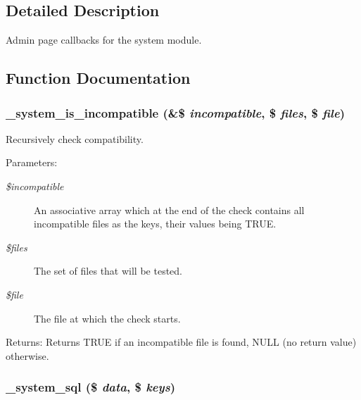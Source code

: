 \subsection{Detailed Description}
Admin page callbacks for the system module. 

\subsection{Function Documentation}
\hypertarget{system_8admin_8inc_d026206dcc488d13c621043f8f6312dd}{
\subsubsection[{\_\-system\_\-is\_\-incompatible}]{\setlength{\rightskip}{0pt plus 5cm}\_\-system\_\-is\_\-incompatible (\&\$ {\em incompatible}, \/  \$ {\em files}, \/  \$ {\em file})}}
\label{system_8admin_8inc_d026206dcc488d13c621043f8f6312dd}


Recursively check compatibility.

\begin{Desc}
\item[Parameters:]
\begin{description}
\item[{\em \$incompatible}]An associative array which at the end of the check contains all incompatible files as the keys, their values being TRUE. \item[{\em \$files}]The set of files that will be tested. \item[{\em \$file}]The file at which the check starts. \end{description}
\end{Desc}
\begin{Desc}
\item[Returns:]Returns TRUE if an incompatible file is found, NULL (no return value) otherwise. \end{Desc}
\hypertarget{system_8admin_8inc_89cb86fe701bfd1e94c18ccdf2700c74}{
\subsubsection[{\_\-system\_\-sql}]{\setlength{\rightskip}{0pt plus 5cm}\_\-system\_\-sql (\$ {\em data}, \/  \$ {\em keys})}}
\label{system_8admin_8inc_89cb86fe701bfd1e94c18ccdf2700c74}


